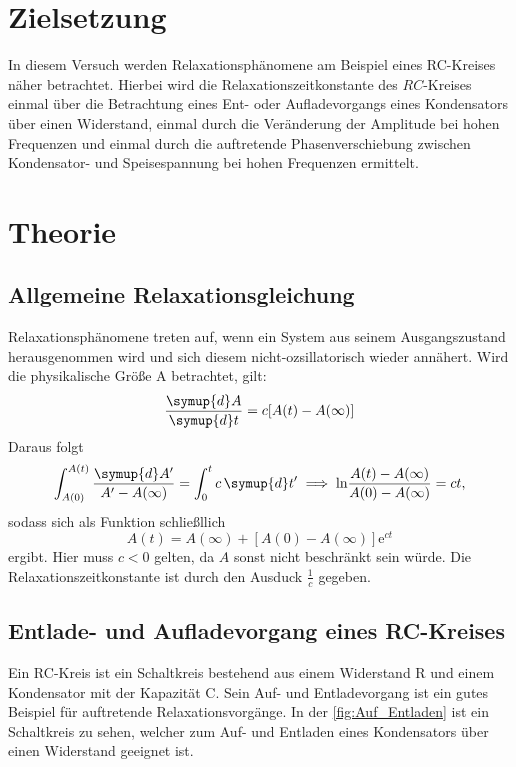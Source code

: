 \section{Zielsetzung}

In diesem Versuch werden Relaxationsphänomene am Beispiel eines RC-Kreises näher betrachtet. Hierbei wird die Relaxationszeitkonstante des $RC$-Kreises einmal
über die Betrachtung eines Ent- oder Aufladevorgangs eines Kondensators über einen Widerstand, einmal durch die Veränderung der Amplitude bei hohen Frequenzen 
und einmal durch die auftretende Phasenverschiebung zwischen Kondensator- und Speisespannung bei hohen Frequenzen ermittelt.
\section{Theorie}
\label{sec:Theorie}

\subsection{Allgemeine Relaxationsgleichung}

    Relaxationsphänomene treten auf, wenn ein System aus seinem Ausgangszustand herausgenommen wird und sich diesem nicht-ozsillatorisch wieder annähert.
    Wird die physikalische Größe A betrachtet, gilt:
    \begin{equation} \label{eq:relaxation}
        \frac{\symup{d}A}{\symup{d}t}=c[A(t)-A(\infty)]
    \end{equation}
    Daraus folgt 
    \begin{equation*}
        \int_{A(0)}^{A(t)} \frac{\symup{d}A'}{A' - A(\infty)} = \int_0^t c \,\symup{d}t' \implies \text{ln} \frac{A(t) - A(\infty)}{A(0) - A(\infty)} = ct,
    \end{equation*}
    sodass sich als Funktion schließllich
    \begin{equation*}
        A(t) = A(\infty) + [A(0) - A(\infty)] \text{e}^{ct}
    \end{equation*}
    ergibt. Hier muss $c<0$ gelten, da $A$ sonst nicht beschränkt sein würde. Die Relaxationszeitkonstante ist durch den Ausduck $\frac{1}{c}$ gegeben.


\subsection{Entlade- und Aufladevorgang eines RC-Kreises}

    Ein RC-Kreis ist ein Schaltkreis bestehend aus einem Widerstand R und einem Kondensator mit der Kapazität C. Sein Auf- und Entladevorgang ist ein gutes Beispiel 
    für auftretende Relaxationsvorgänge. In der \autoref{fig:Auf_Entladen} ist ein Schaltkreis zu sehen, welcher zum Auf- und Entladen eines Kondensators über einen 
    Widerstand geeignet ist.

